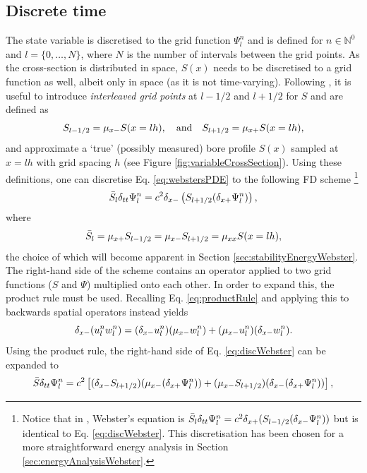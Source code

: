 \subsection{Discrete time}
The state variable is discretised to the grid function $\Psi_l^n$ and is defined for $n\in \mathbb{N}^0$ and $l = \{0, \hdots, N\}$, where $N$ is the number of intervals between the grid points.
As the cross-section is distributed in space, $S(x)$ needs to be discretised to a grid function as well, albeit only in space (as it is not time-varying). Following \cite{Bilbao2018}, it is useful to introduce \textit{interleaved grid points} at $l-1/2$ and $l+1/2$ for $S$ and are defined as 
\begin{equation}\label{eq:sHalf}
    S_{l-1/2} = \mu_{x-} S(x=lh), \quad \text{and} \quad S_{l+1/2} = \mu_{x+} S(x=lh),
\end{equation}
and approximate a `true' (possibly measured) bore profile $S(x)$ sampled at $x=lh$ with grid spacing $h$ (see Figure \ref{fig:variableCrossSection}). Using these definitions, one can discretise Eq. \eqref{eq:webstersPDE} to the following FD scheme \cite{theBible}\footnote{Notice that in \cite{theBible}, Webster's equation is $\bar{S}_l \delta_{tt}\Psi^n_l = c^2\delta_{x+}(S_{l-1/2}(\delta_{x-}\Psi_l^n))$ but is identical to Eq. \eqref{eq:discWebster}. This discretisation has been chosen for a more straightforward energy analysis in Section \ref{sec:energyAnalysisWebster}.}
\begin{equation}\label{eq:discWebster}
    \bar{S}_l \delta_{tt}\Psi^n_l = c^2\delta_{x-}\left(S_{l+1/2}(\delta_{x+}\Psi_l^n)\right),
\end{equation}
where
\begin{equation}\label{eq:Sbar}
    \bar{S}_l = \mu_{x+}S_{l-1/2} = \mu_{x-}S_{l+1/2} = \mu_{xx} S(x=lh),
\end{equation}
the choice of which will become apparent in Section \ref{sec:stabilityEnergyWebster}.
The right-hand side of the scheme contains an operator applied to two grid functions ($S$ and $\Psi$) multiplied onto each other. In order to expand this, the product rule must be used. Recalling Eq. \eqref{eq:productRule} and applying this to backwards spatial operators instead yields
\begin{equation}
    \delta_{x-} (u_l^nw_l^n) = (\delta_{x-} u_l^n)(\mu_{x-} w_l^n) + (\mu_{x-} u_l^n)(\delta_{x-} w_l^n).
\end{equation}
Using the product rule, the right-hand side of Eq. \eqref{eq:discWebster} can be expanded to
\begin{equation*}
    \bar{S}\delta_{tt}\Psi_l^n = c^2\left[(\delta_{x-} S_{l+1/2})(\mu_{x-} (\delta_{x+} \Psi_l^n)) + (\mu_{x-} S_{l+1/2})(\delta_{x-} (\delta_{x+} \Psi_l^n))\right],
\end{equation*}
